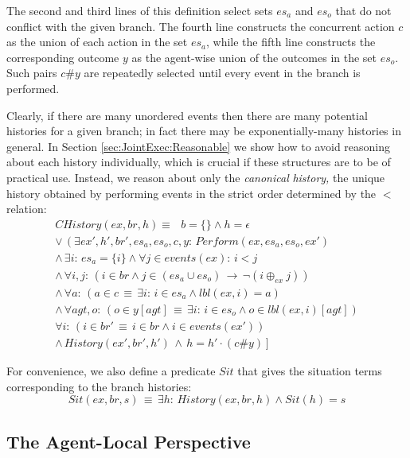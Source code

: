 The second and third lines of this definition select sets $es_{a}$
and $es_{o}$ that do not conflict with the given branch. The fourth
line constructs the concurrent action $c$ as the union of each action
in the set $es_{a}$, while the fifth line constructs the corresponding
outcome $y$ as the agent-wise union of the outcomes in the set $es_{o}$.
Such pairs $c\#y$ are repeatedly selected until every event in the
branch is performed.

Clearly, if there are many unordered events then there are many potential
histories for a given branch; in fact there may be exponentially-many
histories in general. In Section \ref{sec:JointExec:Reasonable} we
show how to avoid reasoning about each history individually, which
is crucial if these structures are to be of practical use. Instead,
we reason about only the \emph{canonical} \emph{history,} the unique
history obtained by performing events in the strict order determined
by the $<$ relation:\begin{gather*}
CHistory(ex,br,h)\equiv\,\,\,\, b=\{\}\wedge h=\epsilon\\
\vee\,\left(\exists ex',h',br',es_{a},es_{o},c,y:\, Perform(ex,es_{a},es_{o},ex')\right.\\
\wedge\,\exists i:\, es_{a}=\{i\}\wedge\forall j\in events(ex):\, i<j\,\\
\wedge\,\forall i,j:\,\left(i\in br\wedge j\in(es_{a}\cup es_{o})\,\rightarrow\,\neg(i\oplus_{ex}j)\right)\\
\wedge\,\forall a:\,\left(a\in c\,\equiv\,\exists i:\, i\in es_{a}\wedge lbl(ex,i)=a\right)\\
\wedge\,\forall agt,o:\,\left(o\in y[agt]\,\equiv\,\exists i:\, i\in es_{o}\wedge o\in lbl(ex,i)[agt]\right)\\
\forall i:\,\left(i\in br'\,\equiv\, i\in br\wedge i\in events(ex')\right)\\
\left.\wedge\, History(ex',br',h')\,\wedge\, h=h'\cdot(c\#y)\right]\end{gather*}


For convenience, we also define a predicate $Sit$ that gives the
situation terms corresponding to the branch histories:\[
Sit(ex,br,s)\,\equiv\,\exists h:\, History(ex,br,h)\wedge Sit(h)=s\]



\subsection{The Agent-Local Perspective}

